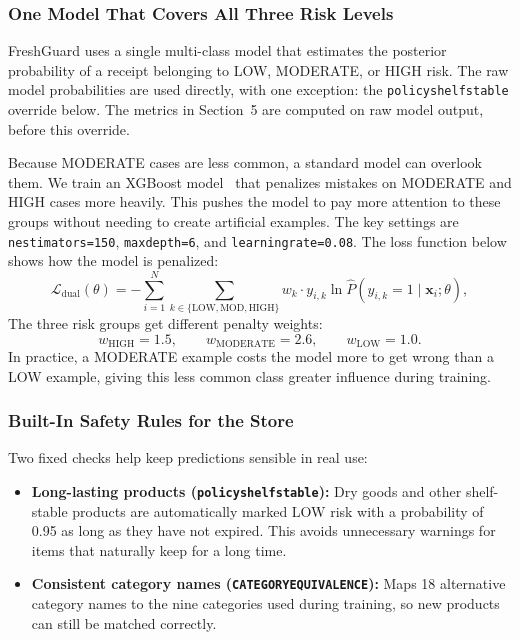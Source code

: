 \documentclass[12pt,a4paper]{article}
\renewcommand{\_}{\oldunderscore\allowbreak}
\begin{document}
\subsubsection{One Model That Covers All Three Risk Levels}
FreshGuard uses a single multi-class model that estimates the posterior probability of a receipt belonging to LOW, MODERATE, or HIGH risk. The raw model probabilities are used directly, with one exception: the \texttt{policy\_shelf\_stable} override below. The metrics in Section~5 are computed on raw model output, before this override.

Because MODERATE cases are less common, a standard model can overlook them. We train an XGBoost model~\cite{chen2016xgboost} that penalizes mistakes on MODERATE and HIGH cases more heavily. This pushes the model to pay more attention to these groups without needing to create artificial examples. The key settings are \texttt{n\_estimators=150}, \texttt{max\_depth=6}, and \texttt{learning\_rate=0.08}. The loss function below shows how the model is penalized:
\begin{equation}
    \mathcal{L}_{\text{dual}}(\theta) = -\sum_{i=1}^{N} \sum_{k \in \{\text{LOW}, \text{MOD}, \text{HIGH}\}} w_k \cdot y_{i,k} \ln \hat{P}(y_{i,k} = 1 \mid \mathbf{x}_i; \theta),
\end{equation}
The three risk groups get different penalty weights:
\begin{equation}
    w_{\text{HIGH}} = 1.5, \qquad w_{\text{MODERATE}} = 2.6, \qquad w_{\text{LOW}} = 1.0.
\end{equation}
In practice, a MODERATE example costs the model more to get wrong than a LOW example, giving this less common class greater influence during training.

\subsubsection{Built-In Safety Rules for the Store}
Two fixed checks help keep predictions sensible in real use:
\begin{itemize}[leftmargin=18pt, itemsep=2pt]
    \item \textbf{Long-lasting products (\texttt{policy\_shelf\_stable}):} Dry goods and other shelf-stable products are automatically marked LOW risk with a probability of 0.95 as long as they have not expired. This avoids unnecessary warnings for items that naturally keep for a long time.
    \item \textbf{Consistent category names (\texttt{CATEGORY\_EQUIVALENCE}):} Maps 18 alternative category names to the nine categories used during training, so new products can still be matched correctly.
\end{itemize}
\end{document}
